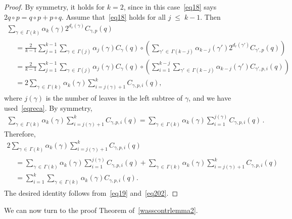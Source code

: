 \documentclass[AHL,Unicode,longabstracts,published]{cedram}
\renewcommand{\leq}{\;\leqslant\;}
\begin{document}
\begin{proof}
By symmetry, it holds for $k=2$, since in this case~\eqref{eq18} says $2q\circ p = q\circ p+p\circ q$. Assume that~\eqref{eq18} holds for all $j\leq k-1$. Then
\begin{multline}\label{eq19}
\sum_{\gamma\,\in\,\Gamma(k)}\alpha_k(\gamma)2^{d_r(\gamma)}C_{\gamma,p}(q)\\
\begin{aligned}
&= \frac2{k-1}\sum_{j=1}^{k-1}
\sum_{\gamma\,\in\,\Gamma(j)}\alpha_j(\gamma)C_{\gamma}(q)\circ\left(
\sum_{\gamma'\,\in\,\Gamma(k-j)}\alpha_{k-j}(\gamma')2^{d_r(\gamma')}C_{\gamma',p}(q) \right)\\
& =
\frac2{k-1}\sum_{j=1}^{k-1}\sum_{\gamma\,\in\,\Gamma(j)}\alpha_j(\gamma)C_{\gamma}(q)\circ\left(
\sum_{i=1}^{k-j}\sum_{\gamma'\,\in\,\Gamma(k-j)}\alpha_{k-j}(\gamma')C_{\gamma',p,i}(q) \right)\\
& = 2
\sum_{\gamma\,\in\,\Gamma(k)}\alpha_k(\gamma)\sum_{i=j(\gamma)+1}^{k}C_{\gamma,p,i}(q),
\end{aligned}
\end{multline}
where $j(\gamma)$ is the number of leaves in the left subtree of $\gamma$, and we have used~\eqref{eqreca}. By symmetry,
\begin{align}\label{eq201}
\sum_{\gamma\,\in\,\Gamma(k)}\alpha_k(\gamma)\sum_{i=j(\gamma)+1}^{k}C_{\gamma,p,i}(q) =
\sum_{\gamma\,\in\,\Gamma(k)}\alpha_k(\gamma)\sum_{i=1}^{j(\gamma)}C_{\gamma,p,i}(q)\,.
\end{align}
Therefore,
\begin{multline}\label{eq202}
2
\sum_{\gamma\,\in\,\Gamma(k)}\alpha_k(\gamma)\sum_{i=j(\gamma)+1}^{k}C_{\gamma,p,i}(q)\\
\begin{aligned}
&=
\sum_{\gamma\,\in\,\Gamma(k)}\alpha_k(\gamma)\sum_{i=1}^{j(\gamma)}C_{\gamma,p,i}(q) +\sum_{\gamma\,\in\,\Gamma(k)}\alpha_k(\gamma)\sum_{i=j(\gamma)+1}^{k}C_{\gamma,p,i}(q) \\
& =
\sum_{i=1}^k\sum_{\gamma\,\in\,\Gamma(k)}\alpha_k(\gamma)C_{\gamma,p,i}(q).
\end{aligned}
\end{multline}
The desired identity follows from~\eqref{eq19} and~\eqref{eq202}.
\end{proof}

We can now turn to the proof Theorem of~\ref{wasscontrlemma2}.
\end{document}
